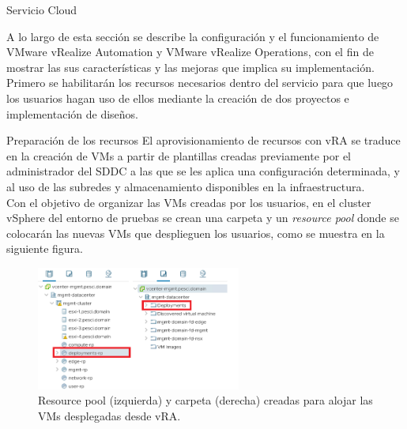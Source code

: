\begin{subsection}{Servicio Cloud}
\label{subsec:plataforma-cloud}
    
    A lo largo de esta sección se describe la configuración y el funcionamiento de VMware vRealize Automation y VMware vRealize Operations, con el fin de mostrar las sus características y las mejoras que implica su implementación. Primero se habilitarán los recursos necesarios dentro del servicio para que luego los usuarios hagan uso de ellos mediante la creación de dos proyectos e implementación de diseños. 

    \begin{subsubsection}{Preparación de los recursos}
    El aprovisionamiento de recursos con vRA se traduce en la creación de VMs a partir de plantillas creadas previamente por el administrador del SDDC a las que se les aplica una configuración determinada, y al uso de las subredes y almacenamiento disponibles en la infraestructura. 
    \\
    Con el objetivo de organizar las VMs creadas por los usuarios, en el cluster vSphere del entorno de pruebas se crean una carpeta y un \textit{resource pool} donde se colocarán las nuevas VMs que desplieguen los usuarios, como se muestra en la siguiente figura.
    \begin{figure}[h]
        \centering
        \includegraphics[width=0.6\textwidth]{imaxes/pruebaconcepto/vrealize/rp-vra.png}
        \caption{Resource pool (izquierda) y carpeta (derecha) creadas para alojar las VMs desplegadas desde vRA.}
        \label{fig:rp-folder-vra}
    \end{figure}
    \FloatBarrier

\end{subsubsection}
\end{subsection}
